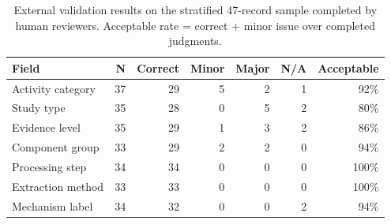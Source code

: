 \begin{table}[t]
\centering
\small
\caption{External validation results on the stratified 47-record sample completed by human reviewers. Acceptable rate = correct + minor issue over completed judgments.}
\label{tab:validation_results}
\begin{tabular}{lrrrrrr}
\toprule
Field & N & Correct & Minor & Major & N/A & Acceptable \\
\midrule
Activity category & 37 & 29 & 5 & 2 & 1 & 92\% \\
Study type & 35 & 28 & 0 & 5 & 2 & 80\% \\
Evidence level & 35 & 29 & 1 & 3 & 2 & 86\% \\
Component group & 33 & 29 & 2 & 2 & 0 & 94\% \\
Processing step & 34 & 34 & 0 & 0 & 0 & 100\% \\
Extraction method & 33 & 33 & 0 & 0 & 0 & 100\% \\
Mechanism label & 34 & 32 & 0 & 0 & 2 & 94\% \\
\bottomrule
\end{tabular}
\end{table}
